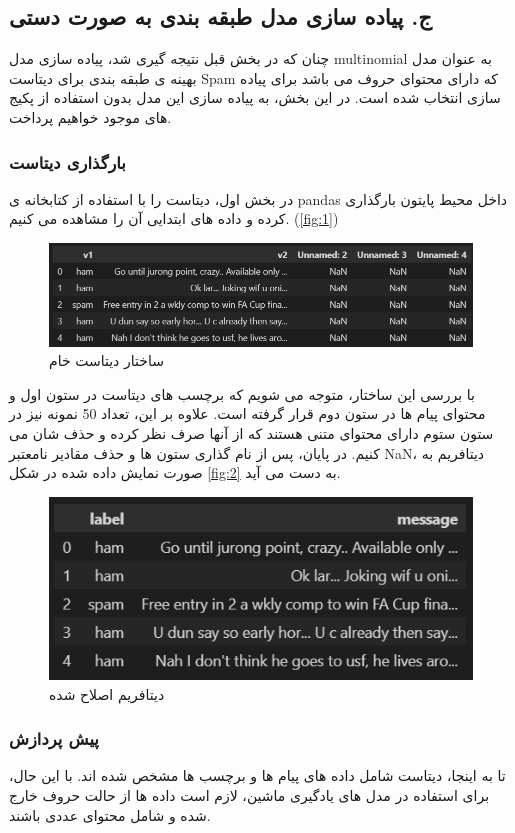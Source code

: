 \documentclass{article}
\begin{document}
\subsection{ج. پیاده سازی مدل طبقه بندی به صورت دستی}
چنان که در بخش قبل نتیجه گیری شد، پیاده سازی مدل multinomial 
به عنوان مدل بهینه ی طبقه بندی برای دیتاست Spam که دارای محتوای حروف می باشد برای پیاده سازی انتخاب شده است. 
در این بخش، به پیاده سازی این مدل بدون استفاده از پکیج های موجود خواهیم پرداخت.

\subsubsection{بارگذاری دیتاست}
در بخش اول، دیتاست را با استفاده از کتابخانه ی pandas داخل محیط پایتون بارگذاری کرده و داده های ابتدایی آن را مشاهده می کنیم. (\autoref{fig:1})
\begin{figure}[h!]
    \centering
    \includegraphics[width=0.5\linewidth]{1.png}
    \caption{ساختار دیتاست خام}
    \label{fig:1}
\end{figure}
\clearpage
با بررسی این ساختار، متوجه می شویم که برچسب های دیتاست در ستون اول و محتوای پیام ها در ستون دوم قرار گرفته است. علاوه بر این، تعداد 50 نمونه نیز در ستون ستوم دارای محتوای متنی هستند که از آنها صرف نظر کرده و حذف شان می کنیم.
در پایان، پس از نام گذاری ستون ها و حذف مقادیر نامعتبر NaN، دیتافریم به صورت نمایش داده شده در شکل \autoref{fig:2} به دست می آید.
\begin{figure}[h!]
    \centering
    \includegraphics[width=0.75\linewidth]{2.png}
    \caption{دیتافریم اصلاح شده}
    \label{fig:2}
\end{figure}
\clearpage


\subsubsection{پیش پردازش}
تا به اینجا، دیتاست شامل داده های پیام ها و برچسب ها مشخص شده اند. با این حال، برای استفاده در مدل های یادگیری ماشین، لازم است داده ها از حالت حروف خارج شده و شامل محتوای عددی باشند.
\end{document}
